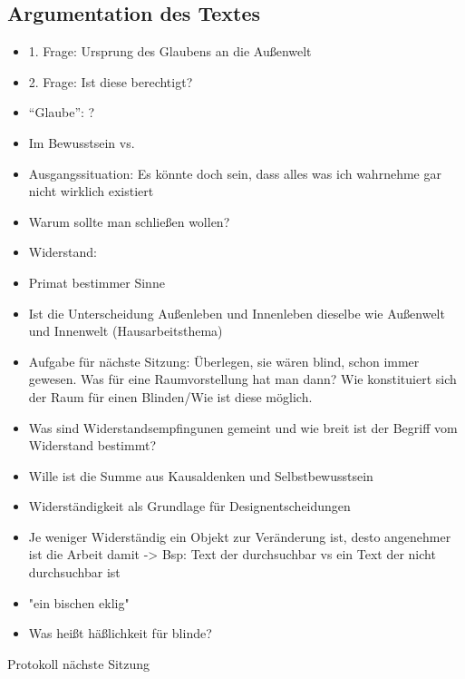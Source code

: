 \documentclass[emulatestandardclasses]{scrartcl}
\begin{document}
\subsection{Argumentation des Textes}

\begin{itemize}
  \item 1. Frage: Ursprung des Glaubens an die Außenwelt
  \item 2. Frage: Ist diese berechtigt?
  \item "`Glaube"': ?
  \item Im Bewusstsein vs. 
  \item Ausgangssituation: Es könnte doch sein, dass alles was ich wahrnehme gar nicht wirklich existiert
  \item Warum sollte man schließen wollen?
  \item Widerstand: 
  \item Primat bestimmer Sinne
  \item Ist die Unterscheidung Außenleben und Innenleben dieselbe wie Außenwelt und Innenwelt (Hausarbeitsthema)
  \item Aufgabe für nächste Sitzung: Überlegen, sie wären blind, schon immer gewesen. Was für eine Raumvorstellung hat man dann? Wie konstituiert sich der Raum für einen Blinden/Wie ist diese möglich.
  \item Was sind Widerstandsempfingunen gemeint und wie breit ist der Begriff vom Widerstand bestimmt?
\end{itemize}


\begin{itemize}
  \item Wille ist die Summe aus Kausaldenken und Selbstbewusstsein
  \item Widerständigkeit als Grundlage für Designentscheidungen
  \item Je weniger Widerständig ein Objekt zur Veränderung ist, desto angenehmer ist die Arbeit   damit -> Bsp: Text der durchsuchbar vs ein Text der nicht durchsuchbar ist
  \item "ein bischen eklig"
  \item Was heißt häßlichkeit für blinde?
\end{itemize}

Protokoll nächste Sitzung


\newpage
%


\end{document}
